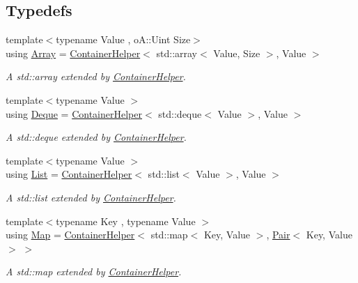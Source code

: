 \subsection*{Typedefs}
\begin{DoxyCompactItemize}
\item 
{\footnotesize template$<$typename Value , o\+A\+::\+Uint Size$>$ }\\using \mbox{\hyperlink{namespaceo_a_a549b65dab9734304711a5195e376afc9}{Array}} = \mbox{\hyperlink{classo_a_1_1_container_helper}{Container\+Helper}}$<$ std\+::array$<$ Value, Size $>$, Value $>$
\begin{DoxyCompactList}\small\item\em A std\+::array extended by \mbox{\hyperlink{classo_a_1_1_container_helper}{Container\+Helper}}. \end{DoxyCompactList}\item 
{\footnotesize template$<$typename Value $>$ }\\using \mbox{\hyperlink{namespaceo_a_a3ac69d4df0d84ed5c8aa6dd69547497d}{Deque}} = \mbox{\hyperlink{classo_a_1_1_container_helper}{Container\+Helper}}$<$ std\+::deque$<$ Value $>$, Value $>$
\begin{DoxyCompactList}\small\item\em A std\+::deque extended by \mbox{\hyperlink{classo_a_1_1_container_helper}{Container\+Helper}}. \end{DoxyCompactList}\item 
{\footnotesize template$<$typename Value $>$ }\\using \mbox{\hyperlink{namespaceo_a_a32faab7cf59b3e127611687f2b55b72e}{List}} = \mbox{\hyperlink{classo_a_1_1_container_helper}{Container\+Helper}}$<$ std\+::list$<$ Value $>$, Value $>$
\begin{DoxyCompactList}\small\item\em A std\+::list extended by \mbox{\hyperlink{classo_a_1_1_container_helper}{Container\+Helper}}. \end{DoxyCompactList}\item 
{\footnotesize template$<$typename Key , typename Value $>$ }\\using \mbox{\hyperlink{namespaceo_a_a90c973ca401158a4b6c0c71a2d86d933}{Map}} = \mbox{\hyperlink{classo_a_1_1_container_helper}{Container\+Helper}}$<$ std\+::map$<$ Key, Value $>$, \mbox{\hyperlink{namespaceo_a_a2e4add9f777dcae3f5afde9e90c75b66}{Pair}}$<$ Key, Value $>$ $>$
\begin{DoxyCompactList}\small\item\em A std\+::map extended by \mbox{\hyperlink{classo_a_1_1_container_helper}{Container\+Helper}}. \end{DoxyCompactList}\item 

\end{DoxyCompactItemize}
